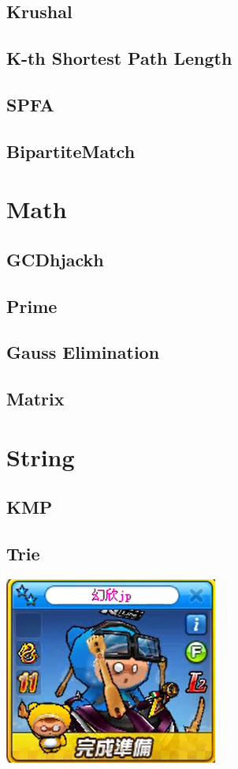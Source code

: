     \subsection{Krushal}
        
    \subsection{K-th Shortest Path Length}
        
    \subsection{SPFA}
        
    \subsection{BipartiteMatch}
        

\section{Math}
    \subsection{GCDhjackh}
        
    \subsection{Prime}
        
    \subsection{Gauss Elimination}
        
    \subsection{Matrix}
        
        
\section{String}
    \subsection{KMP}
        
    \subsection{Trie}
        
\includegraphics{Contents/runrun.png}